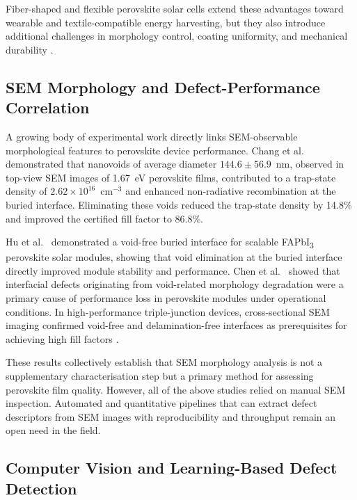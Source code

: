 \documentclass[pdflatex,sn-mathphys-num,iicol]{sn-jnl}
\theoremstyle{thmstyleone}
\theoremstyle{thmstyletwo}
\theoremstyle{thmstylethree}
\begin{document}
Fiber-shaped and flexible perovskite solar cells extend these
advantages toward wearable and textile-compatible energy harvesting,
but they also introduce additional challenges in morphology control,
coating uniformity, and mechanical durability
\cite{balilonda2019,hu2016,qiu2016,diGiacomo2016}.

\subsection{SEM Morphology and Defect-Performance Correlation}
\label{subsec:sem_morphology_correlation}

A growing body of experimental work directly links SEM-observable
morphological features to perovskite device performance. Chang et al.\
\cite{chang2026} demonstrated that nanovoids of average diameter
$144.6 \pm 56.9$~nm, observed in top-view SEM images of 1.67~eV
perovskite films, contributed to a trap-state density of
$2.62 \times 10^{16}$~cm$^{-3}$ and enhanced non-radiative
recombination at the buried interface. Eliminating these voids
reduced the trap-state density by 14.8\% and improved the certified
fill factor to 86.8\%.

Hu et al.\ \cite{hu2023} demonstrated a void-free buried interface
for scalable FAPbI\textsubscript{3} perovskite solar modules, showing
that void elimination at the buried interface directly improved module
stability and performance. Chen et al.\ \cite{chen2021} showed that
interfacial defects originating from void-related morphology
degradation were a primary cause of performance loss in perovskite
modules under operational conditions. In high-performance
triple-junction devices, cross-sectional SEM imaging confirmed
void-free and delamination-free interfaces as prerequisites for
achieving high fill factors \cite{zheng2025}.

These results collectively establish that SEM morphology analysis is
not a supplementary characterisation step but a primary method for
assessing perovskite film quality. However, all of the above studies
relied on manual SEM inspection. Automated and quantitative pipelines
that can extract defect descriptors from SEM images with
reproducibility and throughput remain an open need in the field.

\subsection{Computer Vision and Learning-Based Defect Detection}
\label{subsec:cv_related_work}
\end{document}
